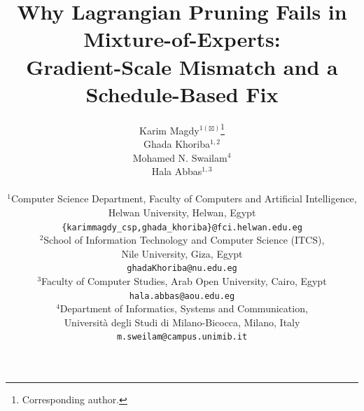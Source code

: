 \documentclass[10pt]{article}
\title{Why Lagrangian Pruning Fails in Mixture-of-Experts:\\Gradient-Scale Mismatch and a Schedule-Based Fix}
\author{
  Karim Magdy$^{1(\boxtimes)}$\thanks{Corresponding author.} \\
  \And
  Ghada Khoriba$^{1,2}$ \\
  \And
  Mohamed N. Swailam$^{4}$ \\
  \And
  Hala Abbas$^{1,3}$ \\
  \\
  $^1$Computer Science Department, Faculty of Computers and Artificial Intelligence, \\
  Helwan University, Helwan, Egypt \\
  \texttt{\{karimmagdy\_csp,ghada\_khoriba\}@fci.helwan.edu.eg} \\
  $^2$School of Information Technology and Computer Science (ITCS), \\
  Nile University, Giza, Egypt \\
  \texttt{ghadaKhoriba@nu.edu.eg} \\
  $^3$Faculty of Computer Studies, Arab Open University, Cairo, Egypt \\
  \texttt{hala.abbas@aou.edu.eg} \\
  $^4$Department of Informatics, Systems and Communication, \\
  Universit\`a degli Studi di Milano-Bicocca, Milano, Italy \\
  \texttt{m.sweilam@campus.unimib.it}
}
\begin{document}
\maketitle
















\newpage
\appendix


\newcommand{\answerYes}[1][]{\textcolor{blue}{[Yes]}~#1}
\newcommand{\answerNo}[1][]{\textcolor{orange}{[No]}~#1}
\newcommand{\answerNA}[1][]{\textcolor{gray}{[N/A]}~#1}
\end{document}
